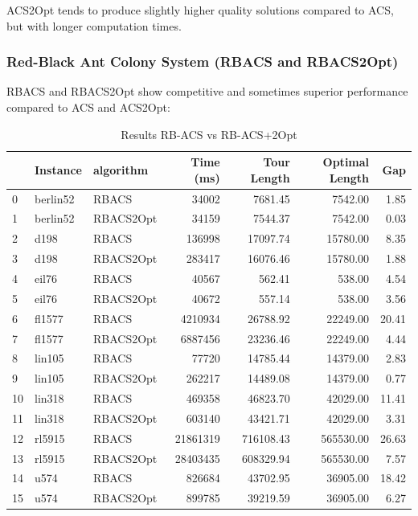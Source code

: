 ACS2Opt tends to produce slightly higher quality solutions compared to ACS, but with longer computation times.

\subsubsection{Red-Black Ant Colony System (RBACS and RBACS2Opt)}
RBACS and RBACS2Opt show competitive and sometimes superior performance compared to ACS and ACS2Opt:


\begin{table}[H]
	\centering
	\caption{Results RB-ACS vs RB-ACS+2Opt}
	\begin{tabular}{lllrrrr}
		\toprule
		   & Instance & algorithm & Time (ms) & Tour Length & Optimal Length & Gap   \\
		\midrule
		0  & berlin52 & RBACS     & 34002      & 7681.45        & 7542.00          & 1.85  \\
		1  & berlin52 & RBACS2Opt & 34159      & 7544.37        & 7542.00          & 0.03  \\
		2  & d198     & RBACS     & 136998     & 17097.74       & 15780.00         & 8.35  \\
		3  & d198     & RBACS2Opt & 283417     & 16076.46       & 15780.00         & 1.88  \\
		4  & eil76    & RBACS     & 40567      & 562.41         & 538.00           & 4.54  \\
		5  & eil76    & RBACS2Opt & 40672      & 557.14         & 538.00           & 3.56  \\
		6  & fl1577   & RBACS     & 4210934    & 26788.92       & 22249.00         & 20.41 \\
		7  & fl1577   & RBACS2Opt & 6887456    & 23236.46       & 22249.00         & 4.44  \\
		8  & lin105   & RBACS     & 77720      & 14785.44       & 14379.00         & 2.83  \\
		9  & lin105   & RBACS2Opt & 262217     & 14489.08       & 14379.00         & 0.77  \\
		10 & lin318   & RBACS     & 469358     & 46823.70       & 42029.00         & 11.41 \\
		11 & lin318   & RBACS2Opt & 603140     & 43421.71       & 42029.00         & 3.31  \\
		12 & rl5915   & RBACS     & 21861319   & 716108.43      & 565530.00        & 26.63 \\
		13 & rl5915   & RBACS2Opt & 28403435   & 608329.94      & 565530.00        & 7.57  \\
		14 & u574     & RBACS     & 826684     & 43702.95       & 36905.00         & 18.42 \\
		15 & u574     & RBACS2Opt & 899785     & 39219.59       & 36905.00         & 6.27  \\
		\bottomrule
	\end{tabular}
\end{table}

